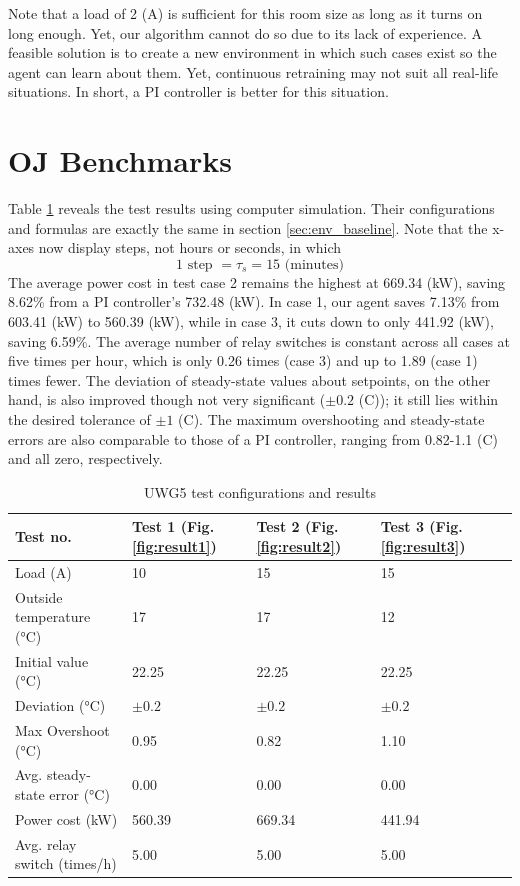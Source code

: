 \documentclass[../main.tex]{subfiles}
\begin{document}
Note that a load of 2 (A) is sufficient for this room size as long as it turns on long enough. Yet, our algorithm cannot do so due to its lack of experience. A feasible solution is to create a new environment in which such cases exist so the agent can learn about them. Yet, continuous retraining may not suit all real-life situations. In short, a PI controller is better for this situation.


\section{OJ Benchmarks}
Table \ref{tab:uwg5_results} reveals the test results using computer simulation. Their configurations and formulas are exactly the same in section \ref{sec:env_baseline}. Note that the x-axes now display steps, not hours or seconds, in which
    $$1 \text{ step } = \tau_s = 15 \text{ (minutes)} $$
The average power cost in test case 2 remains the highest at 669.34 (kW), saving 8.62\% from a PI controller's 732.48 (kW). In case 1, our agent saves 7.13\% from 603.41 (kW) to 560.39 (kW), while in case 3, it cuts down to only 441.92 (kW), saving 6.59\%. The average number of relay switches is constant across all cases at five times per hour, which is only 0.26 times (case 3) and up to 1.89 (case 1) times fewer. The deviation of steady-state values about setpoints, on the other hand, is also improved though not very significant ($\pm 0.2$ (\degree C)); it still lies within the desired tolerance of $\pm 1$ (\degree C). The maximum overshooting and steady-state errors are also comparable to those of a PI controller, ranging from 0.82-1.1 (\degree C) and all zero, respectively.

\begin{table}[htbp]
\caption{UWG5 test configurations and results}
\label{tab:uwg5_results}
\centering
\begin{tabularx}{\textwidth}{|X|X|X|X|X|}
    \hline
    \textbf{Test no.} & \textbf{Test 1} (Fig. \ref{fig:result1}) & \textbf{Test 2} (Fig. \ref{fig:result2}) & \textbf{Test 3} (Fig. \ref{fig:result3}) \\
    \hline
    Load (A) & 10 & 15 & 15 \\
    \hline
    Outside temperature (°C)  & 17 & 17 & 12 \\
    \hline
    Initial value (°C) & 22.25 & 22.25 & 22.25 \\
    \hline \hline
    Deviation (°C) & $\pm 0.2$ & $\pm 0.2$ & $\pm 0.2$ \\
    \hline
    Max Overshoot (°C) & 0.95 & 0.82 & 1.10 \\
    \hline
    Avg. steady-state error (°C) & 0.00 & 0.00 & 0.00 \\
    \hline
    Power cost (kW) & 560.39 & 669.34 & 441.94 \\
    \hline
    Avg. relay switch (times/h) & 5.00 & 5.00 & 5.00 \\
    \hline
\end{tabularx}
\end{table}
\end{document}
